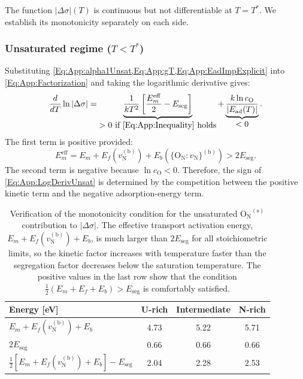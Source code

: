 \documentclass[preprint,12pt,sort&compress]{elsarticle}
\newcommand{\?}{\stackrel{?}{=}}
\begin{document}
The function $|\Delta \sigma|(T)$ is continuous but not differentiable at $T = T^*$. We establish its monotonicity separately on each side.

\subsubsection{Unsaturated regime (\texorpdfstring{$T < T^*$}{T < T*})}

Substituting \cref{Eq:App:alpha1Unsat,Eq:App:gT,Eq:App:EadImpExplicit} into \cref{Eq:App:Factorization} and taking the logarithmic derivative gives:
\begin{equation}
\frac{d}{dT}\ln|\Delta \sigma| =
\underbrace{ \frac{1}{kT^2} \left[ \frac{E_m^\mathrm{eff}}{2} - E_\text{seg} \right] }_{\displaystyle > 0 \text{ if \cref{Eq:App:Inequality} holds}}
+ \underbrace{ \frac{k\ln c_\text{O}}{|E_\text{ad}(T)|} }_{\displaystyle < 0}.
\label{Eq:App:LogDerivUnsat}
\end{equation}
The first term is positive provided:
\begin{equation}
E_m^\mathrm{eff} = E_m + E_f(v_\text{N}^{(\text{b})}) + E_b(\{\text{O}_\text{N}:v_\text{N}\}^{(\text{b})}) > 2 E_\text{seg}.
\label{Eq:App:Inequality}
\end{equation}
The second term is negative because $\ln c_\text{O}<0$. Therefore, the sign of \cref{Eq:App:LogDerivUnsat} is determined by the competition between the positive kinetic term and the negative adsorption-energy term.

\begin{table}[h!]
\footnotesize
\centering
\caption{Verification of the monotonicity condition for the unsaturated $\mathrm{O_N}^{(\mathrm{s})}$ contribution to $|\Delta\sigma|$. The effective transport activation energy, $E_m+E_f(v_\text{N}^{(\text{b})})+E_b$, is much larger than $2E_\text{seg}$ for all stoichiometric limits, so the kinetic factor increases with temperature faster than the segregation factor decreases below the saturation temperature. The positive values in the last row show that the condition $\tfrac{1}{2}(E_m+E_f+E_b)>E_\text{seg}$ is comfortably satisfied.}
\begin{tabular}{lccc}
\hline
Energy [eV] & U-rich & Intermediate & N-rich \\
\hline
$E_m + E_f(v_\text{N}^{(\text{b})}) + E_b$ & 4.73 & 5.22 & 5.71 \\
$2E_\text{seg}$ & 0.66 & 0.66 & 0.66 \\
$\tfrac{1}{2}[E_m + E_f(v_\text{N}^{(\text{b})})+E_b] - E_\text{seg}$ & 2.04 & 2.28 & 2.53 \\
\hline
\end{tabular}
\label{Tab:App:monotonicity}
\end{table}
\end{document}
